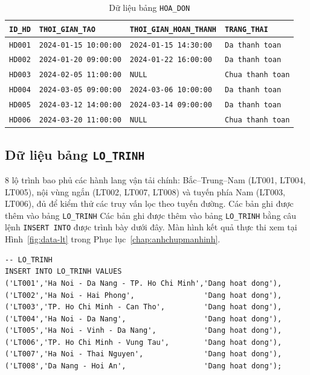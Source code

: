 \documentclass[11pt]{report}
\begin{document}
\begin{table}[H]
    \centering
    \renewcommand{\tabularxcolumn}[1]{m{#1}}
    \begin{tabularx}{\textwidth}{|l|l|l|>{\raggedright\arraybackslash}X|} \hline
        \rowcolor{teal!30}
        \textbf{\texttt{ID\_HD}} & \textbf{\texttt{THOI\_GIAN\_TAO}} & \textbf{\texttt{THOI\_GIAN\_HOAN\_THANH}} & \textbf{\texttt{TRANG\_THAI}} \\ \hline
        \texttt{HD001} & \texttt{2024-01-15 10:00:00} & \texttt{2024-01-15 14:30:00} & \texttt{Da thanh toan} \\ \hline
        \texttt{HD002} & \texttt{2024-01-20 09:00:00} & \texttt{2024-01-22 16:00:00} & \texttt{Da thanh toan} \\ \hline
        \texttt{HD003} & \texttt{2024-02-05 11:00:00} & \texttt{NULL}                & \texttt{Chua thanh toan} \\ \hline
        \texttt{HD004} & \texttt{2024-03-05 09:00:00} & \texttt{2024-03-06 10:00:00} & \texttt{Da thanh toan} \\ \hline
        \texttt{HD005} & \texttt{2024-03-12 14:00:00} & \texttt{2024-03-14 09:00:00} & \texttt{Da thanh toan} \\ \hline
        \texttt{HD006} & \texttt{2024-03-20 11:00:00} & \texttt{NULL}                & \texttt{Chua thanh toan} \\ \hline
    \end{tabularx}
    \caption{Dữ liệu bảng \texttt{HOA\_DON}}
    \label{tab:data_hd}
\end{table}


\subsection{Dữ liệu bảng \texttt{LO\_TRINH}}

8 lộ trình bao phủ các hành lang vận tải chính: Bắc--Trung--Nam (LT001, LT004, LT005), nội vùng ngắn (LT002, LT007, LT008) và tuyến phía Nam (LT003, LT006), đủ để kiểm thử các truy vấn lọc theo tuyến đường. Các bản ghi được thêm vào bảng \texttt{LO\_TRINH} Các bản ghi được thêm vào bảng \texttt{LO\_TRINH} bằng câu lệnh \texttt{INSERT INTO} được trình bày dưới đây. Màn hình kết quả thực thi xem tại Hình~\ref{fig:data-lt} trong Phục lục~\ref{chap:anhchupmanhinh}.

\begin{verbatim}
-- LO_TRINH
INSERT INTO LO_TRINH VALUES
('LT001','Ha Noi - Da Nang - TP. Ho Chi Minh','Dang hoat dong'),
('LT002','Ha Noi - Hai Phong',                'Dang hoat dong'),
('LT003','TP. Ho Chi Minh - Can Tho',         'Dang hoat dong'),
('LT004','Ha Noi - Da Nang',                  'Dang hoat dong'),
('LT005','Ha Noi - Vinh - Da Nang',           'Dang hoat dong'),
('LT006','TP. Ho Chi Minh - Vung Tau',        'Dang hoat dong'),
('LT007','Ha Noi - Thai Nguyen',              'Dang hoat dong'),
('LT008','Da Nang - Hoi An',                  'Dang hoat dong');
\end{verbatim}
\end{document}
